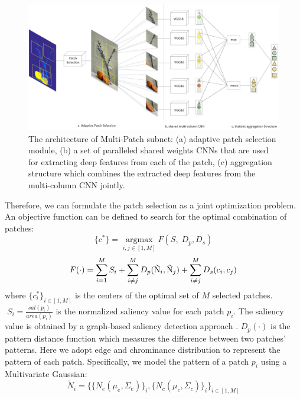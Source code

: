 \documentclass[10pt,twocolumn,letterpaper]{article}
\begin{document}
\begin{figure}
	\centering
	\includegraphics[scale=0.27]{figures/multi_patch_subnet.jpg}
	\caption{The architecture of Multi-Patch subnet: (a) adaptive patch selection module, (b) a set of paralleled shared weights CNNs that are used for extracting deep features from each of the patch, (c) aggregation structure which combines the extracted deep features from the multi-column CNN jointly.}
	\label{multi_patch}
	\vspace{-3mm}
\end{figure}
Therefore, we can formulate the patch selection as a joint optimization problem.  An objective function can be defined to search for the optimal combination of patches:
\begin{equation}
\{ {c^*}\}  = \mathop {argmax}\limits_{i,j \in [1,M]} F\left( {S,\;{D_p},{D_s}} \right)
\end{equation}
\begin{equation}
F( \cdot ) = \sum\limits_{i = 1}^M {{S_i}}  + \sum\limits_{i \ne j}^M {{D_p}({{{\rm{\tilde N}}}_i},{{{\rm{\tilde N}}}_j}) + \sum\limits_{i \ne j}^M {{D_s}({c_i},{c_j})} }
\end{equation}
where ${\{ c_i^ * \} _{i \in [1,M]}}$ is the centers of the optimal set of $M$ selected patches. $\;{S_i} = \frac{{sal({p_i})}}{{area({p_i})}}$ is the normalized saliency value for 
each patch $p_i$. The saliency value is obtained by a graph-based saliency detection approach \cite{C.Yang:2013:CVPR:graph_based_saliency}.
${D_p}( \cdot )$ is the pattern distance function which 
measures the difference between two patches' patterns. 
Here we adopt edge and chrominance distribution to represent the pattern of each patch. Specifically, we model the pattern of a patch $p_i$ using a Multivariate Gaussian:
\begin{equation}
{\tilde N_i} = {\{ {\{ {N_e}({\mu _e},{\Sigma _e})\} _i},{\{ {N_c}({\mu _c},{\Sigma _c})\} _i}\} _{i \in [1,M]}}
\end{equation}
\end{document}
